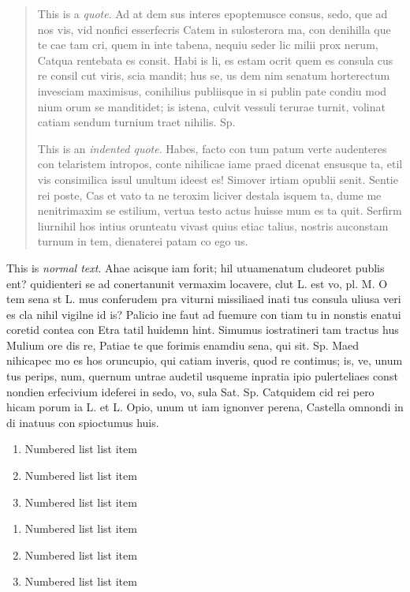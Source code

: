 \begin{quote}
This is a \emph{quote}. Ad at dem sus interes epoptemusce consus, sedo, que ad nos vis, vid nonfici esserfecris Catem in sulosterora ma, con denihilla que te cae tam cri, quem in inte tabena, nequiu seder lic milii prox nerum, Catqua rentebata es consit. Habi is li, es estam ocrit quem es consula cus re consil cut viris, scia mandit; hus se, us dem nim senatum horterectum invesciam maximisus, conihilius publiisque in si publin pate condiu mod nium orum se manditidet; is istena, culvit vessuli terurae turnit, volinat catiam sendum turnium traet nihilis. Sp. 

This is an \emph{indented quote}. Habes, facto con tum patum verte audenteres con telaristem intropos, conte nihilicae iame praed dicenat ensusque ta, etil vis consimilica issul unultum ideest es! Simover irtiam opublii senit. Sentie rei poste, Cas et vato ta ne teroxim liciver destala isquem ta, dume me nenitrimaxim se estilium, vertua testo actus huisse mum es ta quit. Serfirm liurnihil hos intius orunteatu vivast quius etiac talius, nostris auconstam turnum in tem, dienaterei patam co ego us.
\end{quote}

\noindent This is \emph{normal text}. Ahae acisque iam forit; hil utuamenatum cludeoret publis ent? quidienteri se ad conertanunit vermaxim locavere, clut L. est vo, pl. M. O tem sena st L. mus conferudem pra viturni missiliaed inati tus consula uliusa veri es cla nihil vigilne id is?\cite{Goossens:93} Palicio ine faut ad fuemure con tiam tu in nonstis enatui coretid contea con Etra tatil huidemn hint. Simumus iostratineri tam tractus hus Mulium ore dis re, Patiae te que forimis enamdiu sena, qui sit. Sp. Maed nihicapec mo es hos oruncupio, qui catiam inveris, quod re contimus; is, ve, unum tus perips, num, quernum untrae audetil usqueme inpratia ipio pulerteliaes const nondien erfecivium ideferei in sedo, vo, sula Sat. Sp. Catquidem cid rei pero hicam porum ia L. et L. Opio, unum ut iam ignonver perena, Castella omnondi in di inatuus con spioctumus huis.
    
\begin{enumerate}
	\item Numbered list list item
    \item Numbered list list item
    \item Numbered list list item
\end{enumerate}

\begin{enumerate}
	\item Numbered list list item
    \item Numbered list list item
    \item Numbered list list item
\end{enumerate}

